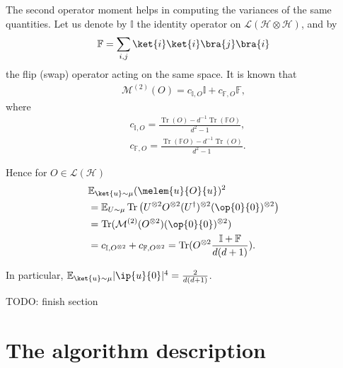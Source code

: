\documentclass[pra,twocolumn,superscriptaddress,longbibliography]{revtex4-2}
\theoremstyle{remark}
\newcommand{\mcl}{\mathcal}
\newcommand{\mbb}{\mathbb}
\DeclareMathOperator{\tr}{Tr}
\numberwithin{equation}{section}
\begin{document}
The second operator moment helps in computing the variances of the same quantities. 
Let us denote by $\mbb{I}$ the identity operator on $\mcl{L}(\mcl{H} \otimes \mcl{H})$, 
and by 
\begin{align}
    \mbb{F} = \sum_{i,j} \ket{i}\ket{i}\bra{j}\bra{i}
\end{align}
the flip (swap) operator acting on the same space. 
It is known that 
\begin{align}
    \mcl{M}^{(2)}(O) = c_{\mbb{I}, O} \mbb{I} + c_{\mbb{F}, O}\mbb{F},
\end{align}
where 
\begin{align}
    & c_{\mbb{I}, O} = \frac{\tr(O) - d^{-1}\tr(\mbb{F}O)}{d^2-1}, \\
    & c_{\mbb{F}, O} = \frac{\tr(\mbb{F}O) - d^{-1}\tr(O)}{d^2-1}.
\end{align}

Hence for $O \in \mcl{L}(\mcl{H})$
\begin{align*}
    & {\mbb{E}}_{\ket{u} \sim \mu} (\melem{u}{O}{u})^2 \\
    & = {\mbb{E}}_{U \sim \mu} \tr\big(U^{\otimes 2}O^{\otimes 2}(U^\dagger)^{\otimes 2} (\op{0}{0})^{\otimes 2}\big) \\
    & = \tr( \mcl{M}^{(2)}(O^{\otimes 2}) (\op{0}{0})^{\otimes 2}) \\
    & = c_{\mbb{I}, O^{\otimes 2}} + c_{\mbb{F}, O^{\otimes 2}} = \tr(O^{\otimes 2}\frac{\mbb{I} + \mbb{F}}{d(d+1)}).
\end{align*}

In particular, ${\mbb{E}}_{\ket{u} \sim \mu} |\ip{u}{0}|^4 = \frac{2}{d(d+1)}$. 

TODO: finish section

\section{The algorithm description}\label{sec:algo}
\end{document}

